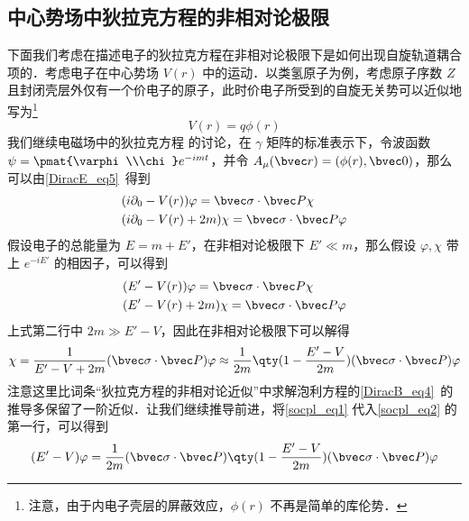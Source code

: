 \subsection{中心势场中狄拉克方程的非相对论极限}
\cite{曾谨言}下面我们考虑在描述电子的狄拉克方程在非相对论极限下是如何出现自旋轨道耦合项的．考虑电子在中心势场 $V(r)$ 中的运动．以类氢原子为例，考虑原子序数 $Z$ 且封闭壳层外仅有一个价电子的原子，此时价电子所受到的自旋无关势可以近似地写为\footnote{注意，由于内电子壳层的屏蔽效应，$\phi(r)$ 不再是简单的库伦势．}
\begin{equation}
V(r)=q\phi(r)
\end{equation}
我们继续电磁场中的狄拉克方程 的讨论，在 $\gamma$ 矩阵的标准表示下，令波函数 $\psi=\pmat{\varphi\\\chi}e^{-imt}$，并令 $A_\mu(\bvec r)=(\phi(r),\bvec 0)$，那么可以由\autoref{DiracE_eq5}~得到
\begin{equation}
\begin{aligned}
&(i\partial_0 - V(r))\varphi = \bvec \sigma\cdot \bvec P \chi\\
&(i\partial_0 - V(r) + 2m) \chi = \bvec \sigma\cdot \bvec P  \varphi
\end{aligned}
\end{equation}
假设电子的总能量为 $E=m+E'$，在非相对论极限下 $E'\ll m$，那么假设 $\varphi,\chi$ 带上 $e^{-iE'}$ 的相因子，可以得到
\begin{equation}\label{socpl_eq2}
\begin{aligned}
&(E' - V(r))\varphi = \bvec \sigma\cdot \bvec P \chi\\
&(E' - V(r) + 2m) \chi = \bvec \sigma\cdot \bvec P  \varphi
\end{aligned}
\end{equation}
上式第二行中 $2m\gg E'-V$，因此在非相对论极限下可以解得
\begin{equation}\label{socpl_eq1}
\chi = \frac{1}{E'-V+2m}(\bvec \sigma\cdot \bvec P)\varphi
\approx\frac{1}{2m}\qty(1-\frac{E'-V}{2m})(\bvec \sigma\cdot \bvec P) \varphi
\end{equation}
注意这里比词条“狄拉克方程的非相对论近似”中求解泡利方程的\autoref{DiracB_eq4}~的推导多保留了一阶近似．让我们继续推导前进，将\autoref{socpl_eq1} 代入\autoref{socpl_eq2} 的第一行，可以得到
\begin{equation}
(E'-V)\varphi = \frac{1}{2m}(\bvec \sigma\cdot \bvec P)\qty(1-\frac{E'-V}{2m})(\bvec \sigma\cdot \bvec P)\varphi
\end{equation}
